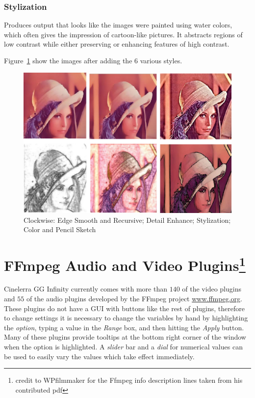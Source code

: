 \subsubsection*{Stylization}%
\label{ssub:stylization}

Produces output that looks like the images were painted using water colors, which often gives the impression of cartoon-like pictures. It abstracts regions of low contrast while either preserving or enhancing features of high contrast.

Figure~\ref{fig:stylize} show the images after adding the 6 various styles.

\begin{figure}[htpb]
    \centering
    \includegraphics[width=0.95\linewidth]{images/stylize.png}
    \caption{Clockwise: Edge Smooth and Recursive; Detail Enhance; Stylization; Color and Pencil Sketch}
    \label{fig:stylize}
\end{figure}

\section{FFmpeg Audio and Video Plugins\protect\footnote{credit to WPfilmmaker for the Ffmpeg info description lines taken from his contributed pdf}}%
\label{sec:ffmpeg_audio_video_plugins}

Cinelerra GG Infinity currently comes with more than $140$ of the video plugins and $55$ of the audio plugins developed by the FFmpeg project \url{www.ffmpeg.org}. These plugins do not have a GUI with buttons like the rest of plugins, therefore to change settings it is necessary to change the variables by hand by highlighting the \textit{option}, typing a value in the \textit{Range} box, and then hitting the \textit{Apply} button. Many of these plugins provide tooltips at the bottom right corner of the window when the option is highlighted. A \textit{slider} bar and a \textit{dial} for numerical values can be used to easily vary the values which take effect immediately.

